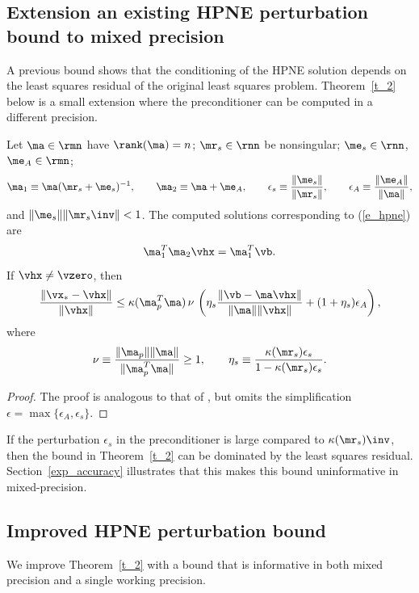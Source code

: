 \documentclass[final]{siamart220329}%
\begin{document}
\subsection{Extension an existing HPNE perturbation bound to mixed precision}\label{HPNE_gen}
A previous bound \cite[Theorem 3.1]{ipsen2025solutionsquaresproblemsrandomized} shows that the 
conditioning of the HPNE solution depends on the least squares residual  of the original least squares problem. Theorem~\ref{t_2} below is a small extension where the preconditioner can be computed in a different precision. 

\begin{theorem}\label{t_2}
Let $\ma\in\rmn$ have $\rank(\ma)=n$; $\mr_s\in\rnn$ be nonsingular;  $\me_s\in\rnn$, $\me_A\in\rmn$; 
\begin{align*}
\ma_1\equiv \ma(\mr_s+\me_s)^{-1},\qquad \ma_2\equiv \ma+\me_A, \qquad
\epsilon_s\equiv\frac{\|\me_s\|}{\|\mr_s\|}, \qquad \epsilon_A\equiv\frac{\|\me_A\|}{\|\ma\|},
\end{align*}
and $\|\me_s\|\|\mr_s\inv\|<1$.
The computed solutions corresponding to (\ref{e_hpne}) are
\begin{align}
\ma_1^T\ma_2\vhx=\ma_1^T\vb.\label{e_t21}
\end{align}
If  $\vhx\neq \vzero$, then
\begin{align*}
\frac{\|\vx_*-\vhx\|}{\|\vhx\|}\leq \kappa(\ma_p^T\ma)\, \nu\, 
\left(\eta_s\frac{\|\vb-\ma\vhx\|}{\|\ma\|\|\vhx\|}+(1+\eta_s)\epsilon_A\right),
\end{align*}
where 
\begin{align*}
\nu\equiv \frac{\|\ma_p\|\|\ma\|}{\|\ma_p^T\ma\|}\geq 1,\qquad 
\eta_s\equiv \frac{\kappa(\mr_s)\epsilon_s}{1-\kappa(\mr_s)\epsilon_s}.
\end{align*}
\end{theorem}

\begin{proof}
The proof is analogous to that of \cite[Theorem 3.1]{ipsen2025solutionsquaresproblemsrandomized}, but 
omits the simplification $\epsilon=\max\{\epsilon_A,\epsilon_s\}$. \end{proof}

If the perturbation $\epsilon_s$ in the preconditioner is large 
compared to $\kappa(\mr_s)\inv$, then the bound in Theorem~\ref{t_2} can be dominated by the least squares residual. Section~\ref{exp_accuracy} illustrates that this makes this bound uninformative in mixed-precision.  


\subsection{Improved HPNE perturbation bound} \label{HPNE_new}
  We improve Theorem~\ref{t_2} with a bound that is informative in  both mixed precision and a single working precision.  
\end{document}
